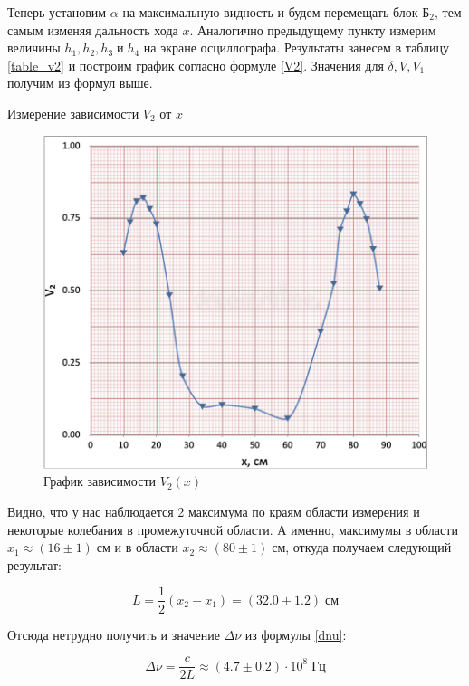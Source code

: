 \documentclass[12pt,a4paper]{article}
\begin{document}
    Теперь установим $ \alpha $ на максимальную видность и будем перемещать блок $ \text{Б}_2 $, тем самым изменяя дальность хода $ x $. Аналогично предыдущему пункту измерим величины $ h_1, h_2, h_3 \; \text{и} \; h_4 $ на экране осциллографа. Результаты занесем в таблицу \ref{table_v2} и построим график согласно формуле \eqref{V2}. Значения для $ \delta, V, V_1 $ получим из формул выше.

     \begin{table}[h!]
       \centering
       \footnotesize
       
       \caption{Измерение зависимости $V_2$ от $x$}
       \label{tab:t1}
    \end{table}	


    \begin{figure}[h!]
        \centering
        \includegraphics[width=0.8\linewidth]{src/v2x.png}
        \caption{График зависимости $V_2 (x)$}
    \end{figure}


    Видно, что у нас наблюдается 2 максимума по краям области измерения и некоторые колебания в промежуточной области. А именно, максимумы в области $ x_1 \approx (16 \pm 1) \; \text{см} $ и в области $ x_2 \approx (80 \pm 1) \; \text{см} $, откуда получаем следующий результат:
    
    \begin{equation}\label{}
    L = \dfrac{1}{2} (x_2 - x_1) = (32.0 \pm 1.2) \; \text{см}
    \end{equation}
    
    Отсюда нетрудно получить и значение $ \Delta \nu $ из формулы \eqref{dnu}:
    
    \begin{equation}\label{}
    \Delta \nu = \dfrac{c}{2L} \approx (4.7 \pm 0.2) \cdot 10^8 \; \text{Гц}
    \end{equation}
    
\end{document}

